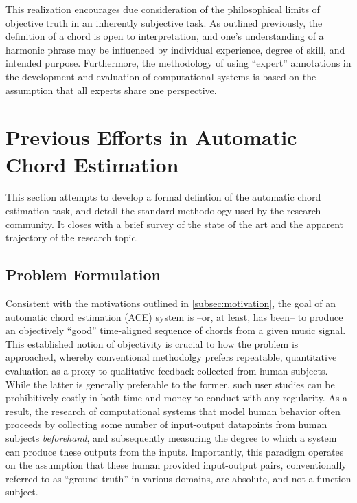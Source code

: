 This realization encourages due consideration of the philosophical limits of objective truth in an inherently subjective task.
As outlined previously, the definition of a chord is open to interpretation, and one's understanding of a harmonic phrase may be influenced by individual experience, degree of skill, and intended purpose.
Furthermore, the methodology of using ``expert'' annotations in the development and evaluation of computational systems is based on the assumption that all experts share one perspective.


\section{Previous Efforts in Automatic Chord Estimation}
\label{sec:background}

This section attempts to develop a formal defintion of the automatic chord estimation task, and detail the standard methodology used by the research community.
It closes with a brief survey of the state of the art and the apparent trajectory of the research topic.


\subsection{Problem Formulation}
\label{subsec:problem_formulation}

Consistent with the motivations outlined in \ref{subsec:motivation}, the goal of an automatic chord estimation (ACE) system is --or, at least, has been-- to produce an objectively ``good'' time-aligned sequence of chords from a given music signal.
This established notion of objectivity is crucial to how the problem is approached, whereby conventional methodolgy prefers repeatable, quantitative evaluation as a proxy to qualitative feedback collected from human subjects.
While the latter is generally preferable to the former, such user studies can be prohibitively costly in both time and money to conduct with any regularity.
As a result, the research of computational systems that model human behavior often proceeds by collecting some number of input-output datapoints from human subjects \emph{beforehand}, and subsequently measuring the degree to which a system can produce these outputs from the inputs.
Importantly, this paradigm operates on the assumption that these human provided input-output pairs, conventionally referred to as ``ground truth'' in various domains, are absolute, and not a function subject.


